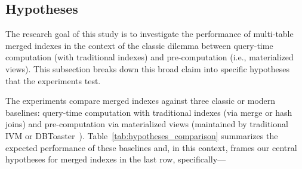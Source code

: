 \documentclass[sigconf, pdfa, nonacm]{acmart}
\begin{document}
\subsection{Hypotheses}\label{subsec:hypotheses}

The research goal of this study is to investigate the performance of multi-table merged indexes in the context of the classic dilemma between query-time computation (with traditional indexes) and pre-computation (i.e., materialized views). This subsection breaks down this broad claim into specific hypotheses that the experiments test.

\begin{table}[htbp]
\centering
\caption{Experiment hypotheses. \textnormal{
    The experiments compare the final row against the baselines in the prior rows. They test the hypothesis that merged indexes match the best of all three baselines regarding query performance, update performance, and space efficiency.
}}\label{tab:hypotheses_comparison}
\small
{}
\end{table} %

The experiments compare merged indexes against three classic or modern baselines: query-time computation with traditional indexes (via merge or hash joins) and pre-computation via materialized views (maintained by traditional IVM or DBToaster~\cite{dbtoaster}). Table~\ref{tab:hypotheses_comparison} summarizes the expected performance of these baselines and, in this context, frames our central hypotheses for merged indexes in the last row, specifically---
\end{document}
